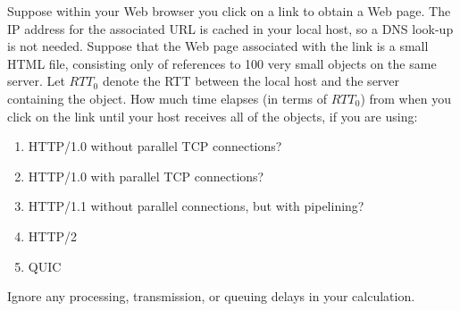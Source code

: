\documentclass{report}
\begin{document}
\begin{problem}
\end{problem}

\clearpage
\begin{problem}
Suppose within your Web browser you click on a link to obtain a Web page.  
The IP address for the associated  URL is cached in your local host, so a DNS look-up is not needed. Suppose that the Web page associated with the link is a small HTML file, consisting only of references to 100 very small objects on the same server.  
Let $RTT_0$ denote the RTT between the local host and the server containing the object. 
How much time elapses (in terms of $RTT_0$) from when you click on the link until your host receives all of the objects, if you are using:
\begin{enumerate}
		\item HTTP/1.0 without parallel TCP connections?
		\item HTTP/1.0 with parallel TCP connections?
		\item HTTP/1.1 without parallel connections, but with pipelining?
		\item HTTP/2
		\item QUIC
\end{enumerate}

Ignore any processing, transmission, or queuing delays in your calculation.\\


\end{problem}
\end{document}
